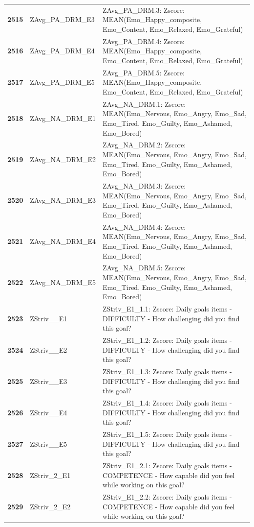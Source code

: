 \documentclass[
  letterpaper,
  DIV=11,
  numbers=noendperiod]{scrartcl}
\begin{document}
\begin{longtable}[t]{>{}cll}
\textbf{2515} & ZAvg\_PA\_DRM\_E3 & ZAvg\_PA\_DRM.3: Zscore:  MEAN(Emo\_Happy\_composite, Emo\_Content, Emo\_Relaxed, Emo\_Grateful)\\
\addlinespace
\textbf{2516} & ZAvg\_PA\_DRM\_E4 & ZAvg\_PA\_DRM.4: Zscore:  MEAN(Emo\_Happy\_composite, Emo\_Content, Emo\_Relaxed, Emo\_Grateful)\\
\textbf{2517} & ZAvg\_PA\_DRM\_E5 & ZAvg\_PA\_DRM.5: Zscore:  MEAN(Emo\_Happy\_composite, Emo\_Content, Emo\_Relaxed, Emo\_Grateful)\\
\textbf{2518} & ZAvg\_NA\_DRM\_E1 & ZAvg\_NA\_DRM.1: Zscore:  MEAN(Emo\_Nervous, Emo\_Angry, Emo\_Sad, Emo\_Tired, Emo\_Guilty, Emo\_Ashamed, Emo\_Bored)\\
\textbf{2519} & ZAvg\_NA\_DRM\_E2 & ZAvg\_NA\_DRM.2: Zscore:  MEAN(Emo\_Nervous, Emo\_Angry, Emo\_Sad, Emo\_Tired, Emo\_Guilty, Emo\_Ashamed, Emo\_Bored)\\
\textbf{2520} & ZAvg\_NA\_DRM\_E3 & ZAvg\_NA\_DRM.3: Zscore:  MEAN(Emo\_Nervous, Emo\_Angry, Emo\_Sad, Emo\_Tired, Emo\_Guilty, Emo\_Ashamed, Emo\_Bored)\\
\addlinespace
\textbf{2521} & ZAvg\_NA\_DRM\_E4 & ZAvg\_NA\_DRM.4: Zscore:  MEAN(Emo\_Nervous, Emo\_Angry, Emo\_Sad, Emo\_Tired, Emo\_Guilty, Emo\_Ashamed, Emo\_Bored)\\
\textbf{2522} & ZAvg\_NA\_DRM\_E5 & ZAvg\_NA\_DRM.5: Zscore:  MEAN(Emo\_Nervous, Emo\_Angry, Emo\_Sad, Emo\_Tired, Emo\_Guilty, Emo\_Ashamed, Emo\_Bored)\\
\textbf{2523} & ZStriv\_\_E1 & ZStriv\_E1\_1.1: Zscore:  Daily goals items - DIFFICULTY - How challenging did you find this goal?\\
\textbf{2524} & ZStriv\_\_E2 & ZStriv\_E1\_1.2: Zscore:  Daily goals items - DIFFICULTY - How challenging did you find this goal?\\
\textbf{2525} & ZStriv\_\_E3 & ZStriv\_E1\_1.3: Zscore:  Daily goals items - DIFFICULTY - How challenging did you find this goal?\\
\addlinespace
\textbf{2526} & ZStriv\_\_E4 & ZStriv\_E1\_1.4: Zscore:  Daily goals items - DIFFICULTY - How challenging did you find this goal?\\
\textbf{2527} & ZStriv\_\_E5 & ZStriv\_E1\_1.5: Zscore:  Daily goals items - DIFFICULTY - How challenging did you find this goal?\\
\textbf{2528} & ZStriv\_2\_E1 & ZStriv\_E1\_2.1: Zscore:  Daily goals items - COMPETENCE - How capable did you feel while working on this goal?\\
\textbf{2529} & ZStriv\_2\_E2 & ZStriv\_E1\_2.2: Zscore:  Daily goals items - COMPETENCE - How capable did you feel while working on this goal?\\

\end{longtable}
\end{document}

